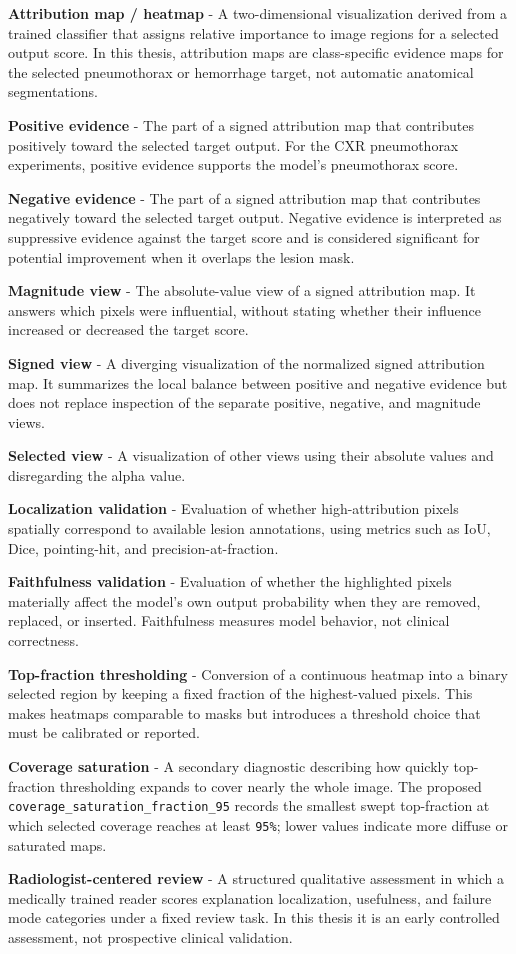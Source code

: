 \textbf{Attribution map / heatmap} - A two-dimensional visualization
derived from a trained classifier that assigns relative importance to
image regions for a selected output score. In this thesis, attribution
maps are class-specific evidence maps for the selected pneumothorax or
hemorrhage target, not automatic anatomical segmentations.

\textbf{Positive evidence} - The part of a signed attribution map that
contributes positively toward the selected target output. For the CXR
pneumothorax experiments, positive evidence supports the model's
pneumothorax score.

\textbf{Negative evidence} - The part of a signed attribution map that
contributes negatively toward the selected target output. Negative
evidence is interpreted as suppressive evidence against the target score
and is considered significant for potential improvement when it overlaps 
the lesion mask.

\textbf{Magnitude view} - The absolute-value view of a signed
attribution map. It answers which pixels were influential, without
stating whether their influence increased or decreased the target score.

\textbf{Signed view} - A diverging visualization of the normalized
signed attribution map. It summarizes the local balance between positive
and negative evidence but does not replace inspection of the separate
positive, negative, and magnitude views.

\textbf{Selected view} - A visualization of other views using their
absolute values and disregarding the alpha value.

\textbf{Localization validation} - Evaluation of whether
high-attribution pixels spatially correspond to available lesion
annotations, using metrics such as IoU, Dice, pointing-hit, and
precision-at-fraction.

\textbf{Faithfulness validation} - Evaluation of whether the highlighted
pixels materially affect the model's own output probability when they
are removed, replaced, or inserted. Faithfulness measures model
behavior, not clinical correctness.

\textbf{Top-fraction thresholding} - Conversion of a continuous heatmap
into a binary selected region by keeping a fixed fraction of the
highest-valued pixels. This makes heatmaps comparable to masks but
introduces a threshold choice that must be calibrated or reported.

\textbf{Coverage saturation} - A secondary diagnostic describing how
quickly top-fraction thresholding expands to cover nearly the whole
image. The proposed \texttt{coverage\_saturation\_fraction\_95} records
the smallest swept top-fraction at which selected coverage reaches at
least \texttt{95\%}; lower values indicate more diffuse or saturated
maps.

\textbf{Radiologist-centered review} - A structured qualitative
assessment in which a medically trained reader scores explanation
localization, usefulness, and failure mode categories under a fixed
review task. In this thesis it is an early controlled assessment, not
prospective clinical validation.
